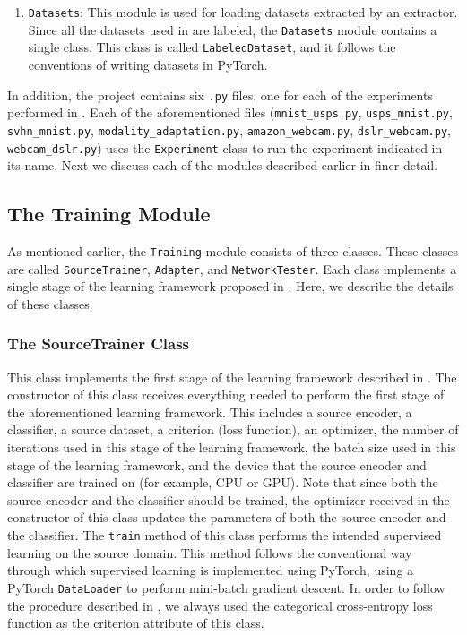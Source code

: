 \documentclass[14pt]{extarticle}
\begin{document}
\begin{enumerate}
			\item \texttt{Datasets}: This module is used for loading datasets extracted by an extractor. Since all the datasets used in \cite{adda} are labeled, the \texttt{Datasets} module contains a single class. This class is called \texttt{LabeledDataset}, and it follows the conventions of writing datasets in PyTorch.
		\end{enumerate}
		In addition, the project contains six \texttt{.py} files, one for each of the experiments performed in \cite{adda}. Each of the aforementioned files (\texttt{mnist\_usps.py}, \texttt{usps\_mnist.py}, \texttt{svhn\_mnist.py}, \texttt{modality\_adaptation.py}, \texttt{amazon\_webcam.py}, \texttt{dslr\_webcam.py}, \texttt{webcam\_dslr.py}) uses the \texttt{Experiment} class to run the experiment indicated in its name. Next we discuss each of the modules described earlier in finer detail.
		\subsection{The Training Module}
		As mentioned earlier, the \texttt{Training} module consists of three classes. These classes are called \texttt{SourceTrainer}, \texttt{Adapter}, and \texttt{NetworkTester}. Each class implements a single stage of the learning framework proposed in \cite{adda}. Here, we describe the details of these classes.
		\subsubsection{The SourceTrainer Class}
		This class implements the first stage of the learning framework described in \cite{adda}. The constructor of this class receives everything needed to perform the first stage of the aforementioned learning framework. This includes a source encoder, a classifier, a source dataset, a criterion (loss function), an optimizer, the number of iterations used in this stage of the learning framework, the batch size used in this stage of the learning framework, and the device that the source encoder and classifier are trained on (for example, CPU or GPU). Note that since both the source encoder and the classifier should be trained, the optimizer received in the constructor of this class updates the parameters of both the source encoder and the classifier. The \texttt{train} method of this class performs the intended supervised learning on the source domain. This method follows the conventional way through which supervised learning is implemented using PyTorch, using a PyTorch \texttt{DataLoader} to perform mini-batch gradient descent. In order to follow the procedure described in \cite{adda}, we always used the categorical cross-entropy loss function as the criterion attribute of this class.
\end{document}
